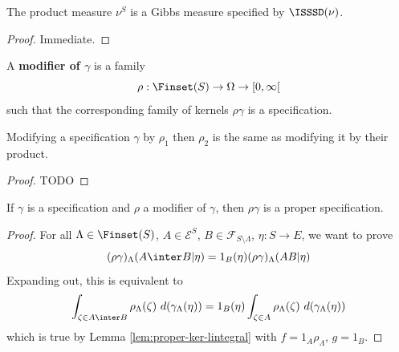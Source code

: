 \begin{lemma}
    \label{lem:isssd-gibbs-meas-existence}
    \leanok{}

    The product measure $\nu^S$ is a Gibbs measure specified by $\ISSSD(\nu)$.
\end{lemma}
\begin{proof}
    \leanok

   Immediate.
\end{proof}

\begin{definition}[Modifier]
    \label{def:modif}
    \leanok{}

    A {\bf modifier of $\gamma$} is a family
    \[\rho : \Finset(S) \to \Omega \to [0, \infty[\]
    such that the corresponding family of kernels $\rho\gamma$ is a specification.
\end{definition}

\begin{lemma}
    \label{lem:modif-modif}
    \leanok{}

    Modifying a specification $\gamma$ by $\rho_1$ then $\rho_2$ is the same as modifying it by their product.
\end{lemma}
\begin{proof}
    \leanok

    TODO
\end{proof}


\begin{lemma}
    \label{lem:modif-proper}
    \leanok{}

    If $\gamma$ is a specification and $\rho$ a modifier of $\gamma$, then $\rho\gamma$ is a proper specification.
\end{lemma}
\begin{proof}
    \leanok

    For all $\Lambda \in \Finset(S)$, $A \in \mathcal E^S$, $B \in \mathcal{F}_{S\setminus\Lambda}$, $\eta : S \to E$, we want to prove
    $$(\rho\gamma)_\Lambda(A \inter B | \eta) = 1_B(\eta) (\rho\gamma)_\Lambda(A B | \eta)$$
    Expanding out, this is equivalent to
    $$\int_{\zeta \in A \inter B} \rho_\Lambda(\zeta)\ d(\gamma_\Lambda(\eta)) = 1_B(\eta) \int_{\zeta \in A} \rho_\Lambda(\zeta)\ d(\gamma_\Lambda(\eta))$$
    which is true by Lemma \ref{lem:proper-ker-lintegral} with $f = 1_A\rho_\Lambda$, $g = 1_B$.
\end{proof}

